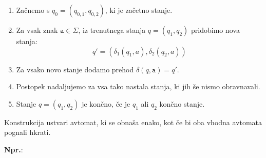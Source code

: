\documentclass{report}
\newcommand{\Ex}{\textbf{Npr.}:\ }
\newcommand{\Alphabet}{\Sigma}
\newcommand{\Char}[1]{\texttt{#1}}
\begin{document}
\begin{enumerate}
  \item Začnemo s $q_0 = (q_{0,1}, q_{0,2})$, ki je začetno stanje.
  \item Za vsak znak $\Char{a} \in \Alphabet$, iz trenutnega stanja $q = (q_1, q_2)$ pridobimo nova stanja:
    \begin{equation*}
      q' = (\delta_1(q_1, a), \delta_2(q_2, a))
    \end{equation*}
  \item Za vsako novo stanje dodamo prehod $\delta(q, \Char{a}) = q'$.
  \item Postopek nadaljujemo za vsa tako nastala stanja, ki jih še nismo obravnavali.
  \item Stanje $q = (q_1, q_2)$ je končno, če je $q_1$ ali $q_2$ končno stanje.
\end{enumerate}

Konstrukcija ustvari avtomat, ki se obnaša enako, kot če bi oba vhodna avtomata pognali hkrati.

\Ex
\end{document}
